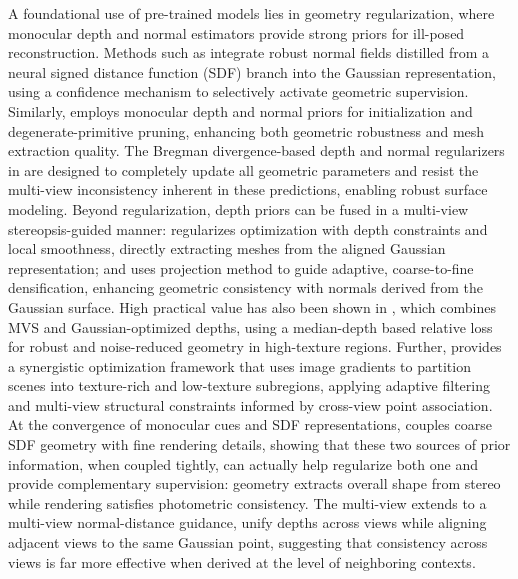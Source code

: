 \documentclass[11pt,a4paper]{article}
\begin{document}
A foundational use of pre-trained models lies in geometry regularization, where monocular depth and normal estimators provide strong priors for ill-posed reconstruction. Methods such as \cite{arxiv:2509.12742v4} integrate robust normal fields distilled from a neural signed distance function (SDF) branch into the Gaussian representation, using a confidence mechanism to selectively activate geometric supervision. Similarly, \cite{arxiv:2605.00569v1} employs monocular depth and normal priors for initialization and degenerate-primitive pruning, enhancing both geometric robustness and mesh extraction quality. The Bregman divergence-based depth and normal regularizers in \cite{arxiv:2406.05774v1} are designed to completely update all geometric parameters and resist the multi-view inconsistency inherent in these predictions, enabling robust surface modeling. Beyond regularization, depth priors can be fused in a multi-view stereopsis-guided manner: \cite{arxiv:2403.17822v1} regularizes optimization with depth constraints and local smoothness, directly extracting meshes from the aligned Gaussian representation; and \cite{arxiv:2407.11840v1} uses projection method to guide adaptive, coarse-to-fine densification, enhancing geometric consistency with normals derived from the Gaussian surface. High practical value has also been shown in \cite{arxiv:2506.13508v1}, which combines MVS and Gaussian-optimized depths, using a median-depth based relative loss for robust and noise-reduced geometry in high-texture regions. Further, \cite{arxiv:2602.12796v1} provides a synergistic optimization framework that uses image gradients to partition scenes into texture-rich and low-texture subregions, applying adaptive filtering and multi-view structural constraints informed by cross-view point association. At the convergence of monocular cues and SDF representations, \cite{arxiv:2507.15602v2} couples coarse SDF geometry with fine rendering details, showing that these two sources of prior information, when coupled tightly, can actually help regularize both one and provide complementary supervision: geometry extracts overall shape from stereo while rendering satisfies photometric consistency. The multi-view \cite{arxiv:2508.07701v2} extends to a multi-view normal-distance guidance, unify depths across views while aligning adjacent views to the same Gaussian point, suggesting that consistency across views is far more effective when derived at the level of neighboring contexts.
\end{document}
